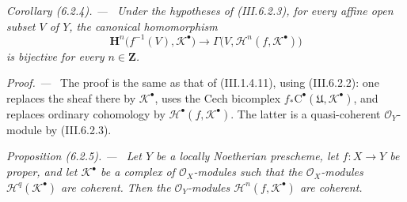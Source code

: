 \documentclass[10pt,oneside]{book}
\newcommand{\sh}[1]{\mathscr{#1}}
\newcommand{\bb}[1]{\mathbf{#1}}
\newcommand{\sref}[2][]{(#2)}
\newcommand{\oldpage}[2][]{\setcounter{footnote}{0}\marginpar{\scriptsize\textbf{#1}~|~#2}\ignorespaces}
\newenvironment{proposition}[1][]{\par\medskip\noindent\itshape Proposition (#1). ---\ }{\par}
\newenvironment{corollary}[1][]{\par\medskip\noindent\itshape Corollary (#1). ---\ }{\par}
\newenvironment{proof}{\par\medskip\noindent\textit{Proof. ---\ }}{\par}
\begin{document}
\begin{corollary}[6.2.4]
\label{III.6.2.4}
\oldpage[III]{140}
Under the hypotheses of \sref{III.6.2.3}, for every affine open
subset $V$ of $Y$, the canonical homomorphism
\[
  \mathbf{H}^n\bigl(f^{-1}(V),\sh{K}^\bullet\bigr)
  \longrightarrow
  \Gamma\bigl(V,\mathcal{H}^n(f,\sh{K}^\bullet)\bigr)
  \tag{6.2.4.1}\label{III.6.2.4.1}
\]
is bijective for every $n\in\bb{Z}$.
\end{corollary}

\begin{proof}
The proof is the same as that of \sref{III.1.4.11}, using
\sref{III.6.2.2}: one replaces the sheaf there by
$\sh{K}^\bullet$, uses the Cech bicomplex
$f_*\mathrm{C}^\bullet(\mathfrak{U},\sh{K}^\bullet)$, and replaces
ordinary cohomology by
$\mathcal{H}^\bullet(f,\sh{K}^\bullet)$.  The latter is a
quasi-coherent $\sh{O}_Y$-module by \sref{III.6.2.3}.
\end{proof}

\begin{proposition}[6.2.5]
\label{III.6.2.5}
Let $Y$ be a locally Noetherian prescheme, let $f:X\to Y$ be
proper, and let $\sh{K}^\bullet$ be a complex of
$\sh{O}_X$-modules such that the $\sh{O}_X$-modules
$\sh{H}^q(\sh{K}^\bullet)$ are coherent.  Then the
$\sh{O}_Y$-modules $\mathcal{H}^n(f,\sh{K}^\bullet)$ are
coherent.
\end{proposition}
\end{document}
